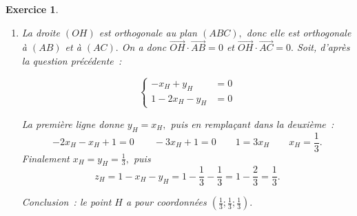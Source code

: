 \documentclass[10pt]{article}
\newtheorem{exo}{Exercice}
\begin{document}
\begin{exo}
\begin{enumerate}
puis
\begin{align*}
\overrightarrow{OH}\cdot\overrightarrow{AB}&=x_H\times (-1)+y_H\times 1+\left(1-x_H-y_H\right)\times 0=-x_H+y_H,\\
\overrightarrow{OH}\cdot\overrightarrow{AC}&=x_H\times (-1)+y_H\times 0+\left(1-x_H-y_H\right)\times 1=-x_H+1-x_H-y_H=1-2x_H-y_H.
\end{align*}

\item La droite $(OH)$ est orthogonale au plan $(ABC),$ donc elle est orthogonale à $(AB)$ et à $(AC).$ On a donc $\overrightarrow{OH}\cdot \overrightarrow{AB}=0$ et $\overrightarrow{OH}\cdot \overrightarrow{AC}=0.$ Soit, d'après la question précédente~:

\[\begin{cases}
-x_H+y_H&=0
\\ 1-2x_H-y_H&=0
\end{cases}
\]

La première ligne donne $y_H=x_H,$ puis en remplaçant dans la deuxième~:
\[-2x_H-x_H+1=0\qquad -3x_H+1=0\qquad 1=3x_H\qquad x_H=\frac{1}{3}.\]
Finalement $x_H=y_H=\frac{1}{3},$ puis \[z_H=1-x_H-y_H=1-\frac{1}{3}-\frac{1}{3}=1-\frac{2}{3}=\frac{1}{3}.\]

Conclusion~: le point $H$ a pour coordonnées $\left(\frac{1}{3};\frac{1}{3};\frac{1}{3}\right).$

\end{enumerate}


\end{exo}
\end{document}
